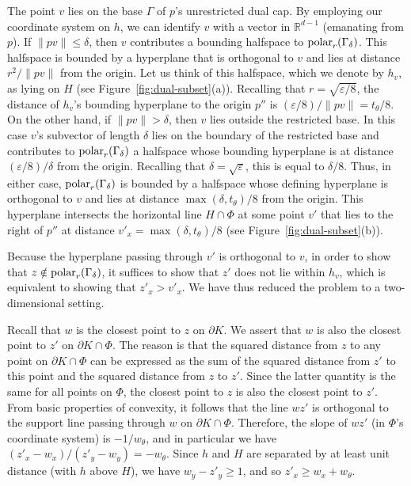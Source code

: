\documentclass[11pt]{article}   \usepackage[letterpaper,hmargin=2.1cm,vmargin=3cm]{geometry}
\newcommand{\RE}{\mathbb{R}}    \newcommand{\ZZ}{\mathbb{Z}}    \newcommand{\eps}{\varepsilon}  \newcommand{\ST}{\,:\,}         \newcommand{\sq}{\square}
\begin{document}
The point $v$ lies on the base $\Gamma$ of $p$'s unrestricted dual cap. By employing our coordinate system on $h$, we can identify $v$ with a vector in $\RE^{d-1}$ (emanating from $p$). If $\|p v\| \le \delta$, then $v$ contributes a bounding halfspace to $\mathrm{polar}_{r}(\Gamma_{\delta})$. This halfspace is bounded by a hyperplane that is orthogonal to $v$ and lies at distance $r^2/\|p v\|$ from the origin. Let us think of this halfspace, which we denote by $h_v$, as lying on $H$ (see Figure~\ref{fig:dual-subset}(a)). Recalling that $r = \sqrt{\eps/8}$, the distance of $h_v$'s bounding hyperplane to the origin $p''$ is $(\eps/8)/\|p v\| = t_{\theta}/8$. On the other hand, if $\|p v\| > \delta$, then $v$ lies outside the restricted base. In this case $v$'s subvector of length $\delta$ lies on the boundary of the restricted base and contributes to $\mathrm{polar}_{r}(\Gamma_{\delta})$ a halfspace whose bounding hyperplane is at distance $(\eps/8)/\delta$ from the origin. Recalling that $\delta = \sqrt{\eps}$, this is equal to $\delta/8$. Thus, in either case, $\mathrm{polar}_{r}(\Gamma_{\delta})$ is bounded by a halfspace whose defining hyperplane is orthogonal to $v$ and lies at distance $\max(\delta, t_{\theta})/8$ from the origin. This hyperplane intersects the horizontal line $H \cap \Phi$ at some point $v'$ that lies to the right of $p''$ at distance $v'_x = \max(\delta, t_{\theta})/8$ (see Figure~\ref{fig:dual-subset}(b)). 

Because the hyperplane passing through $v'$ is orthogonal to $v$, in order to show that $z \notin \mathrm{polar}_{r}(\Gamma_{\delta})$, it suffices to show that $z'$ does not lie within $h_v$, which is equivalent to showing that $z'_x > v'_x$. We have thus reduced the problem to a two-dimensional setting.

Recall that $w$ is the closest point to $z$ on $\partial K$. We assert that $w$ is also the closest point to $z'$ on $\partial K \cap \Phi$. The reason is that the squared distance from $z$ to any point on $\partial K \cap \Phi$ can be expressed as the sum of the squared distance from $z'$ to this point and the squared distance from $z$ to $z'$. Since the latter quantity is the same for all points on $\Phi$, the closest point to $z$ is also the closest point to $z'$. From basic properties of convexity, it follows that the line $w z'$ is orthogonal to the support line passing through $w$ on $\partial K \cap \Phi$. Therefore, the slope of $w z'$ (in $\Phi$'s coordinate system) is $-1/w_{\theta}$, and in particular we have $(z'_x - w_x)/(z'_y - w_y) = -w_{\theta}$. Since $h$ and $H$ are separated by at least unit distance (with $h$ above $H$), we have $w_y - z'_y \ge 1$, and so $z'_x \ge w_x + w_{\theta}$. 
\end{document}
